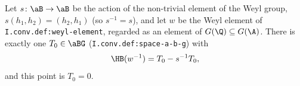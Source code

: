 Let $s\colon\aB\to\aB$ be the action of the non-trivial element of the Weyl group, $s(h_1,h_2)=(h_2,h_1)$ (so $s^{-1}=s$), and let $w$ be the
Weyl element of \texttt{I.conv.def:weyl-element}, regarded as an element of $G(\Q)\subseteq G(\A)$. There is exactly one $T_0\in\aBG$
(\texttt{I.conv.def:space-a-b-g}) with
\[
  \HB(w^{-1})=T_0-s^{-1}T_0 ,
\]
and this point is $T_0=0$.
